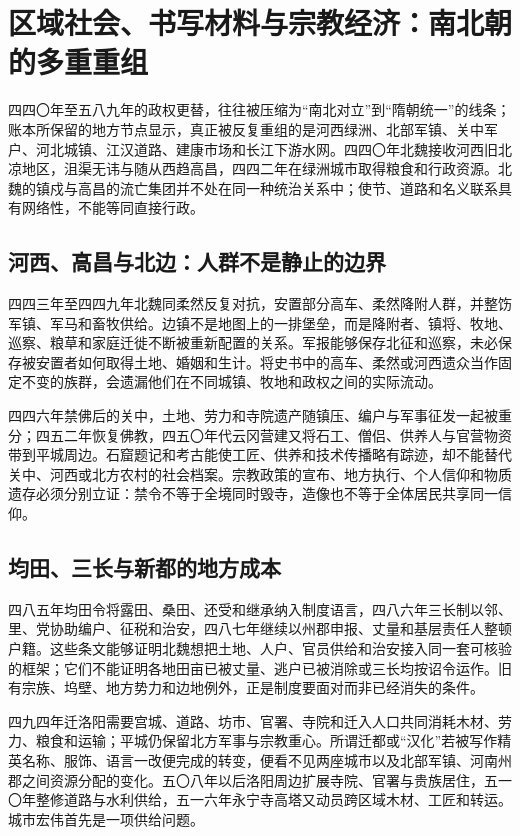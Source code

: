 \section{区域社会、书写材料与宗教经济：南北朝的多重重组}
\label{sec:northern-southern-regions-documents-religion}

四四〇年至五八九年的政权更替，往往被压缩为“南北对立”到“隋朝统一”的线条；账本所保留的地方节点显示，真正被反复重组的是河西绿洲、北部军镇、关中军户、河北城镇、江汉道路、建康市场和长江下游水网。四四〇年北魏接收河西旧北凉地区，沮渠无讳与随从西趋高昌，四四二年在绿洲城市取得粮食和行政资源。北魏的镇戍与高昌的流亡集团并不处在同一种统治关系中；使节、道路和名义联系具有网络性，不能等同直接行政。

\subsection{河西、高昌与北边：人群不是静止的边界}

四四三年至四四九年北魏同柔然反复对抗，安置部分高车、柔然降附人群，并整饬军镇、军马和畜牧供给。边镇不是地图上的一排堡垒，而是降附者、镇将、牧地、巡察、粮草和家庭迁徙不断被重新配置的关系。军报能够保存北征和巡察，未必保存被安置者如何取得土地、婚姻和生计。将史书中的高车、柔然或河西遗众当作固定不变的族群，会遗漏他们在不同城镇、牧地和政权之间的实际流动。

四四六年禁佛后的关中，土地、劳力和寺院遗产随镇压、编户与军事征发一起被重分；四五二年恢复佛教，四五〇年代云冈营建又将石工、僧侣、供养人与官营物资带到平城周边。石窟题记和考古能使工匠、供养和技术传播略有踪迹，却不能替代关中、河西或北方农村的社会档案。宗教政策的宣布、地方执行、个人信仰和物质遗存必须分别立证：禁令不等于全境同时毁寺，造像也不等于全体居民共享同一信仰。

\subsection{均田、三长与新都的地方成本}

四八五年均田令将露田、桑田、还受和继承纳入制度语言，四八六年三长制以邻、里、党协助编户、征税和治安，四八七年继续以州郡申报、丈量和基层责任人整顿户籍。这些条文能够证明北魏想把土地、人户、官员供给和治安接入同一套可核验的框架；它们不能证明各地田亩已被丈量、逃户已被消除或三长均按诏令运作。旧有宗族、坞壁、地方势力和边地例外，正是制度要面对而非已经消失的条件。

四九四年迁洛阳需要宫城、道路、坊市、官署、寺院和迁入人口共同消耗木材、劳力、粮食和运输；平城仍保留北方军事与宗教重心。所谓迁都或“汉化”若被写作精英名称、服饰、语言一改便完成的转变，便看不见两座城市以及北部军镇、河南州郡之间资源分配的变化。五〇八年以后洛阳周边扩展寺院、官署与贵族居住，五一〇年整修道路与水利供给，五一六年永宁寺高塔又动员跨区域木材、工匠和转运。城市宏伟首先是一项供给问题。

